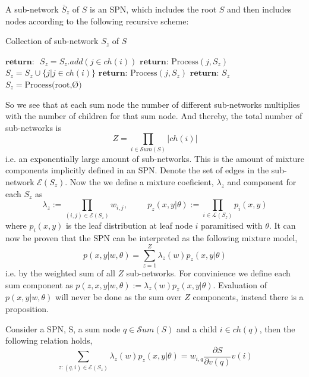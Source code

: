 \begin{definition} 
    A sub-network $\bar S_z$ of $S$ is an SPN, which includes the root $S$ and then includes nodes
    according to the following recursive scheme: 
\end{definition}
\begin{algorithm}[H]
    \caption*{Collection of sub-network $S_z$ of $S$}\label{SPN4}
    \begin{algorithmic}
        \State  $\textbf{return: }$ 
    \EndIf
        \State $S_z =S_z.add(j \in ch(i))$ 
        \State $\textbf{return: } \text{Process}(j, S_z)$
    \EndIf
        \State $S_z =S_z \cup \{j | j \in ch(i)\}$ 
            \State $\textbf{return: } \text{Process}(j,S_z)$
        \EndFor
    \EndIf
    \State $\textbf{return: } S_z$
    \EndFunction
    \State $S_z =  \text{Process(root,Ø)}$
    \end{algorithmic}
\end{algorithm}
So we see that at each sum node the number of different sub-networks multiplies with the number of children for that
sum node. And thereby, the total number of sub-networks is
 $$Z = \prod_{i\in \mathcal{S}um(S)}|ch(i)|$$ 
 i.e. an exponentially large amount of sub-networks. This is the amount of
 mixture components implicitly defined in an SPN. 
 Denote the set of edges in the sub-network $\mathcal{E}(S_z)$.
Now the we define a mixture coeficient, $\lambda_z$ and component for each $S_z$ as 
$$\lambda_z := \prod_{(i,j)\in \mathcal{E}(S_z)} w_{i,j}, \hspace{1cm}
p_z(x,y|\theta) := \prod_{i \in \mathcal{L}(S_z)} p_i(x,y)$$
where $p_i(x,y)$ is the leaf distribution at leaf node $i$ paramitised with $\theta$. 
It can now be proven that the SPN can be interpreted as the following mixture model, 
$$p(x,y|w,\theta) = \sum_{z=1}^Z \lambda_z(w)p_z(x,y|\theta)$$
i.e. by the weighted sum of all $Z$ sub-networks. For convinience
we define each sum component as $p(z,x,y|w,\theta) := \lambda_z(w)p_z(x,y|\theta)$.
Evaluation of $p(x,y|w,\theta)$ will never be done as the sum over $Z$ components, 
instead there is a proposition. 

\begin{proposition}
    Consider a SPN, S, a sum node $q \in \mathcal{S}um(S)$ and a child $i \in ch(q)$,
    then the following relation holds, 
    $$\sum_{z:(q,i)\in \mathcal{E}(S_z)} \lambda_z(w) p_z(x,y|\theta) = w_{i,q}
    \frac{\partial S}{\partial v(q)} v(i)$$
\end{proposition}



